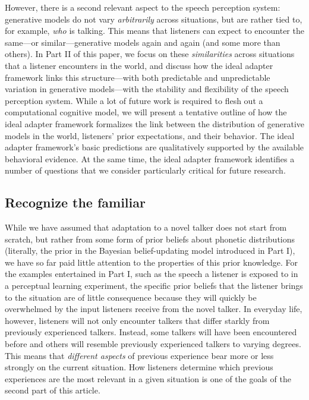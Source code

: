 However, there is a second relevant aspect to the speech perception system: generative models do not vary \emph{arbitrarily} across situations, but are rather tied to, for example, \emph{who} is talking.  This means that listeners can expect to encounter the same---or similar---generative models again and again (and some more than others).  In Part II of this paper, we focus on these \emph{similarities} across situations that a listener encounters in the world, and discuss how the ideal adapter framework links this structure---with both predictable and unpredictable variation in generative models---with the stability and flexibility of the speech perception system.  While a lot of future work is required to flesh out a computational cognitive model, we will present a tentative outline of how the ideal adapter framework formalizes the link between the distribution of generative models in the world, listeners' prior expectations, and their behavior.  The ideal adapter framework's basic predictions are qualitatively supported by the available behavioral evidence.  At the same time, the ideal adapter framework identifies a number of questions that we consider particularly critical for future research.

\subsection{Recognize the familiar}
\label{sec:recognize-familiar}

While we have assumed that adaptation to a novel talker does not start from scratch, but rather from some form of prior beliefs about phonetic distributions (literally, the prior in the Bayesian belief-updating model introduced in Part I), we have so far paid little attention to the properties of this prior knowledge.  For the examples entertained in Part I, such as the speech a listener is exposed to in a perceptual learning experiment, the specific prior beliefs that the listener brings to the situation are of little consequence because they will quickly be overwhelmed by the input listeners receive from the novel talker. In everyday life, however, listeners will not only encounter talkers that differ starkly from previously experienced talkers. Instead, some talkers will have been encountered before and others will resemble previously experienced talkers to varying degrees. This means that {\em different aspects} of previous experience bear more or less strongly on the current situation. How listeners determine which previous experiences are the most relevant in a given situation is one of the goals of the second part of this article. 

